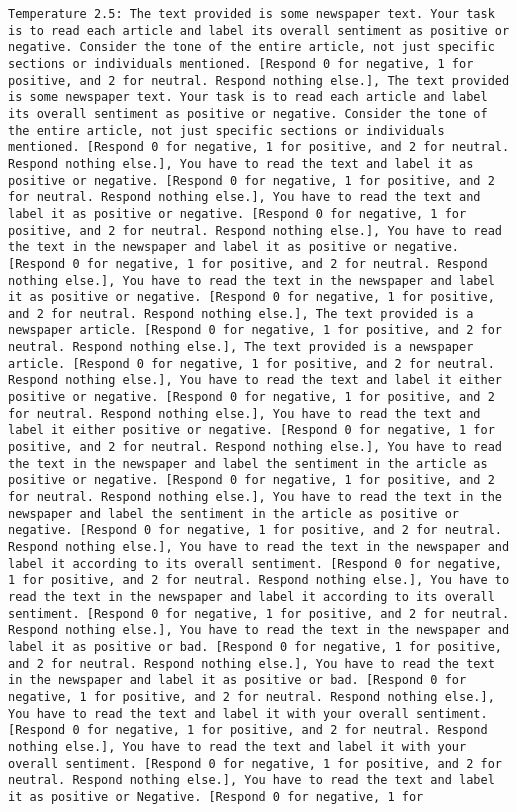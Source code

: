 \begin{lstlisting}[label=lst:poor_performing_prompts]
	Temperature 2.5: The text provided is some newspaper text. Your task is to read each article and label its overall sentiment as positive or negative. Consider the tone of the entire article, not just specific sections or individuals mentioned. [Respond 0 for negative, 1 for positive, and 2 for neutral. Respond nothing else.], The text provided is some newspaper text. Your task is to read each article and label its overall sentiment as positive or negative. Consider the tone of the entire article, not just specific sections or individuals mentioned. [Respond 0 for negative, 1 for positive, and 2 for neutral. Respond nothing else.], You have to read the text and label it as positive or negative. [Respond 0 for negative, 1 for positive, and 2 for neutral. Respond nothing else.], You have to read the text and label it as positive or negative. [Respond 0 for negative, 1 for positive, and 2 for neutral. Respond nothing else.], You have to read the text in the newspaper and label it as positive or negative. [Respond 0 for negative, 1 for positive, and 2 for neutral. Respond nothing else.], You have to read the text in the newspaper and label it as positive or negative. [Respond 0 for negative, 1 for positive, and 2 for neutral. Respond nothing else.], The text provided is a newspaper article. [Respond 0 for negative, 1 for positive, and 2 for neutral. Respond nothing else.], The text provided is a newspaper article. [Respond 0 for negative, 1 for positive, and 2 for neutral. Respond nothing else.], You have to read the text and label it either positive or negative. [Respond 0 for negative, 1 for positive, and 2 for neutral. Respond nothing else.], You have to read the text and label it either positive or negative. [Respond 0 for negative, 1 for positive, and 2 for neutral. Respond nothing else.], You have to read the text in the newspaper and label the sentiment in the article as positive or negative. [Respond 0 for negative, 1 for positive, and 2 for neutral. Respond nothing else.], You have to read the text in the newspaper and label the sentiment in the article as positive or negative. [Respond 0 for negative, 1 for positive, and 2 for neutral. Respond nothing else.], You have to read the text in the newspaper and label it according to its overall sentiment. [Respond 0 for negative, 1 for positive, and 2 for neutral. Respond nothing else.], You have to read the text in the newspaper and label it according to its overall sentiment. [Respond 0 for negative, 1 for positive, and 2 for neutral. Respond nothing else.], You have to read the text in the newspaper and label it as positive or bad. [Respond 0 for negative, 1 for positive, and 2 for neutral. Respond nothing else.], You have to read the text in the newspaper and label it as positive or bad. [Respond 0 for negative, 1 for positive, and 2 for neutral. Respond nothing else.], You have to read the text and label it with your overall sentiment. [Respond 0 for negative, 1 for positive, and 2 for neutral. Respond nothing else.], You have to read the text and label it with your overall sentiment. [Respond 0 for negative, 1 for positive, and 2 for neutral. Respond nothing else.], You have to read the text and label it as positive or Negative. [Respond 0 for negative, 1 for 
\end{lstlisting}
